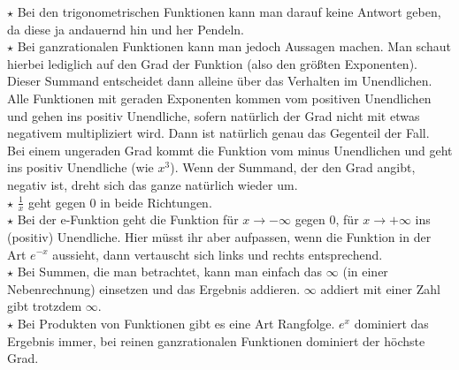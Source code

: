 		\(\star\) Bei den trigonometrischen Funktionen kann man darauf keine Antwort
		geben, da diese ja andauernd hin und her Pendeln.\\

		\(\star\) Bei ganzrationalen Funktionen kann man jedoch Aussagen machen. Man
		schaut hierbei lediglich auf den Grad der Funktion (also den größten
		Exponenten). Dieser Summand entscheidet dann alleine über das Verhalten im
		Unendlichen. Alle Funktionen mit geraden Exponenten kommen vom positiven
		Unendlichen und gehen ins positiv Unendliche, sofern natürlich der Grad nicht
		mit etwas negativem multipliziert wird. Dann ist natürlich genau das Gegenteil
		der Fall.\\
		Bei einem ungeraden Grad kommt die Funktion vom minus Unendlichen und geht ins
		positiv Unendliche (wie \(x^3\)). Wenn der Summand, der den Grad angibt,
		negativ ist, dreht sich das ganze natürlich wieder um.\\

		\(\star\) \(\frac{1}{x}\) geht gegen 0 in beide Richtungen.\\

		\(\star\) Bei der e-Funktion geht die Funktion für \(x\rightarrow -\infty\)
		gegen 0, für \(x\rightarrow + \infty\) ins (positiv) Unendliche. Hier müsst
		ihr aber aufpassen, wenn die Funktion in der Art \(e^{-x}\) aussieht, dann
		vertauscht sich links und rechts entsprechend.\\

		\(\star\) Bei Summen, die man betrachtet, kann man einfach das \(\infty\) (in
		einer Nebenrechnung) einsetzen und das Ergebnis addieren. \(\infty\) addiert
		mit einer Zahl gibt trotzdem \(\infty\).\\

		\(\star\) Bei Produkten von Funktionen gibt es eine Art Rangfolge. \(e^x\)
		dominiert das Ergebnis immer, bei reinen ganzrationalen Funktionen dominiert
		der höchste Grad.


